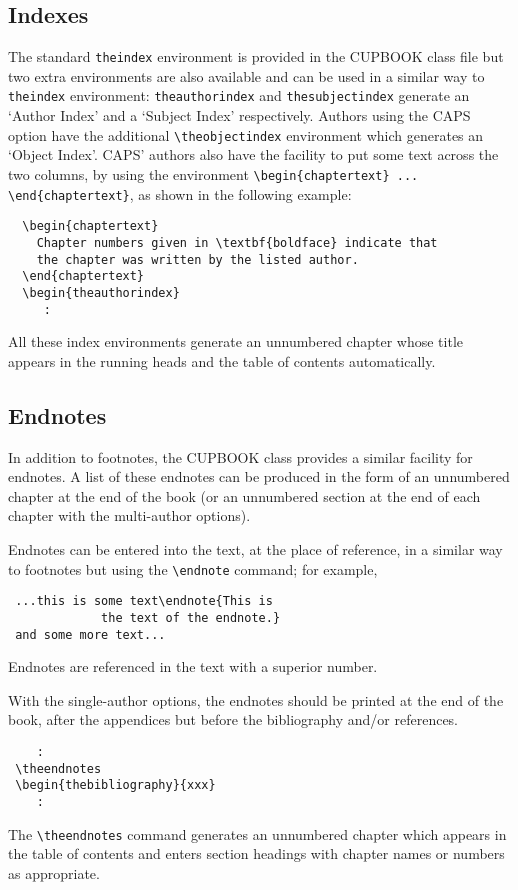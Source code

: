 \documentclass[cup6a]{cupbook}
\begin{document}
\subsection{Indexes}

The standard \verb"theindex" environment is provided in the CUPBOOK
class file but two extra environments are also available and can be 
used in a similar way to \verb"theindex" environment:
\verb"theauthorindex" and \verb"thesubjectindex"
generate an `Author Index' and a `Subject Index' respectively.
Authors using the CAPS option have the additional \verb"\theobjectindex" environment which generates an `Object Index'. CAPS' authors
also have the facility to put some text across the two columns, 
by using the environment \verb"\begin{chaptertext} ... \end{chaptertext}", 
as shown in the following example:
\begin{verbatim}
  \begin{chaptertext}
    Chapter numbers given in \textbf{boldface} indicate that 
    the chapter was written by the listed author.
  \end{chaptertext}
  \begin{theauthorindex}
     :
\end{verbatim}
All these index environments generate an unnumbered chapter whose
title appears in the running heads and the table of contents
automatically.

\subsection{Endnotes}

In addition to footnotes, the CUPBOOK class provides a similar
facility for endnotes.
 A list of these endnotes can be produced in the form of an unnumbered
chapter at the end of the book (or an unnumbered section at the end of
each chapter with the multi-author options).

Endnotes can be entered into the text, at the place of reference, in a
similar way to footnotes but using the \verb"\endnote" command;
for example,
\begin{verbatim}
 ...this is some text\endnote{This is
             the text of the endnote.}
 and some more text...
\end{verbatim}
 Endnotes are referenced in the text with a superior number.

With the single-author options, the endnotes should be printed at the
end of the book, after the appendices but before the bibliography
and/or references.
 \begin{verbatim}
    :
 \theendnotes
 \begin{thebibliography}{xxx}
    :
\end{verbatim}
The \verb"\theendnotes" command generates an unnumbered
chapter which appears in the table of contents and enters section
headings with chapter names or numbers as appropriate.
\end{document}
